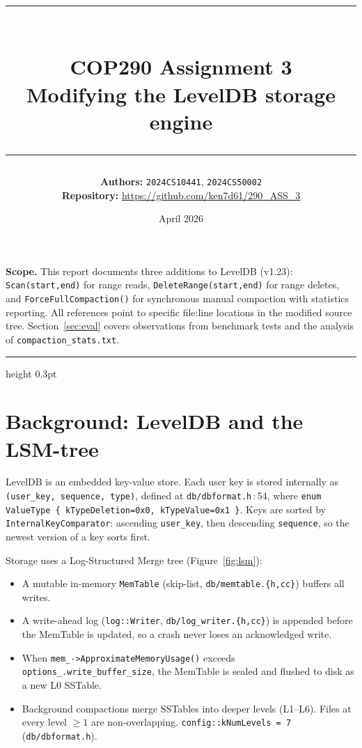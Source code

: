 \documentclass[11pt,a4paper]{article}
\title{
    \vspace{-2.5em}
    {\color{primary}\rule{\linewidth}{1.2pt}}\\[0.4em]
    {\Huge\bfseries\color{primary} COP290 Assignment 3}\\[0.3em]
    {\Large\color{primary!80!black} Modifying the LevelDB storage engine}\\[0.4em]
    {\color{primary}\rule{\linewidth}{0.6pt}}
}
\author{
    \large
    \textbf{Authors:} \texttt{2024CS10441}, \texttt{2024CS50002} \\[0.3em]
    \textbf{Repository:} \url{https://github.com/ken7d61/290_ASS_3}
}
\date{April 2026}
\newcommand{\codref}[2]{\textcolor{accent}{\texttt{\small#1}}\,$\!:\!$\textcolor{primary!70!black}{\small#2}}
\newcommand{\fname}[1]{\textcolor{primary!85!black}{\texttt{#1}}}
\newcommand{\sym}[1]{\texttt{#1}}
\begin{document}
\maketitle
\thispagestyle{empty}

\vspace{0.5em}
\begin{tcolorbox}[colback=soft, colframe=rule, boxrule=0.4pt, arc=2pt]
\small\textbf{Scope.} This report documents three additions to LevelDB (v1.23):
\texttt{Scan(start,end)} for range reads, \texttt{DeleteRange(start,end)} for
range deletes, and \texttt{ForceFullCompaction()} for synchronous manual compaction
with statistics reporting. All references point to specific file:line locations
in the modified source tree. Section~\ref{sec:eval} covers observations from
benchmark tests and the analysis of \texttt{compaction\_stats.txt}.
\end{tcolorbox}

\vspace{1em}
{\color{primary}\hrule height 0.3pt}
\tableofcontents
\newpage

\section{Background: LevelDB and the LSM-tree}

LevelDB is an embedded key-value store. Each user key is stored internally as
\sym{(user\_key, sequence, type)}, defined at \codref{db/dbformat.h}{54}, where
\sym{enum ValueType \{ kTypeDeletion=0x0, kTypeValue=0x1 \}}.
Keys are sorted by \sym{InternalKeyComparator}: ascending \sym{user\_key},
then descending \sym{sequence}, so the newest version of a key sorts first.

Storage uses a Log-Structured Merge tree (Figure~\ref{fig:lsm}):
\begin{itemize}[leftmargin=1.4em,itemsep=2pt]
    \item A mutable in-memory \fname{MemTable} (skip-list,
          \fname{db/memtable.\{h,cc\}}) buffers all writes.
    \item A write-ahead log (\sym{log::Writer}, \fname{db/log\_writer.\{h,cc\}})
          is appended before the MemTable is updated, so a crash never loses
          an acknowledged write.
    \item When \sym{mem\_->ApproximateMemoryUsage()} exceeds
          \sym{options\_.write\_buffer\_size}, the MemTable is sealed and
          flushed to disk as a new L0 SSTable.
    \item Background compactions merge SSTables into deeper levels (L1--L6).
          Files at every level $\ge 1$ are non-overlapping.
          \sym{config::kNumLevels = 7} (\fname{db/dbformat.h}).
\end{itemize}
\end{document}
